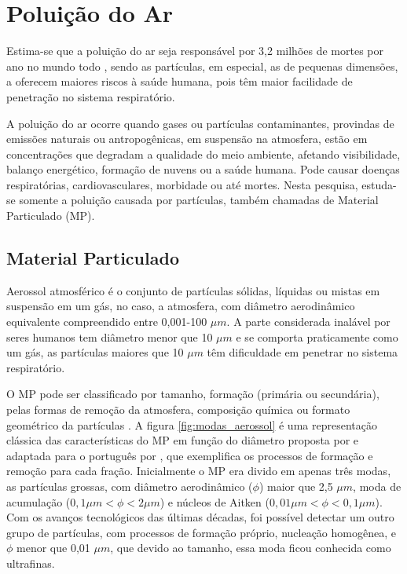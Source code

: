 \section{Poluição do Ar}

Estima-se que a poluição do ar seja responsável por 3,2 milhões de mortes 
por ano no mundo todo \citep{lim2013}, sendo as partículas, em especial, as 
de pequenas dimensões, a oferecem maiores riscos à saúde humana, pois têm 
maior facilidade de penetração no sistema respiratório.

A poluição do ar ocorre quando gases ou partículas contaminantes, 
provindas de emissões naturais ou antropogênicas, 
em suspensão na atmosfera, estão em concentrações que degradam 
a qualidade do meio ambiente, afetando visibilidade, balanço energético, 
formação de nuvens ou a saúde humana. Pode causar doenças respiratórias, 
cardiovasculares, morbidade ou até mortes. Nesta pesquisa, estuda-se somente 
a poluição causada por partículas, também chamadas de Material Particulado (MP).

\subsection{Material Particulado}

Aerossol atmosférico é o conjunto de partículas sólidas, líquidas ou 
mistas em suspensão em um gás, no caso, a atmosfera, com diâmetro 
aerodinâmico equivalente compreendido entre 0,001-100 $\mu m$. A parte 
considerada inalável por seres humanos tem diâmetro menor que 10 $\mu m$
e se comporta praticamente como um gás, as partículas maiores que 10 $\mu m$ 
têm dificuldade em penetrar no sistema respiratório.

O MP pode ser classificado por tamanho, formação (primária ou secundária), 
pelas formas de remoção da atmosfera, composição química ou formato 
geométrico da partículas \citep{seinfeld2012}. A figura \ref{fig:modas_aerossol} 
é uma representação clássica das características 
do MP em função do diâmetro proposta por \citet{finlayson1999} e adaptada 
para o português por \citet{oliveira2007}, que exemplifica os processos de 
formação e remoção para cada fração. Inicialmente o MP era divido em apenas 
três modas, as partículas grossas, com  diâmetro  aerodinâmico ($\phi$) 
maior que 2,5 $\mu m$, moda de acumulação ($ 0,1\mu m <\phi< 2\mu m$) e 
núcleos de Aitken ($ 0,01\mu m <\phi< 0,1\mu m$). Com os avanços tecnológicos
das últimas décadas, foi possível detectar um outro grupo de partículas,
com processos de formação próprio, nucleação homogênea, e $\phi$ menor que 
0,01 $\mu m$, que devido ao tamanho, essa moda ficou conhecida como ultrafinas.

